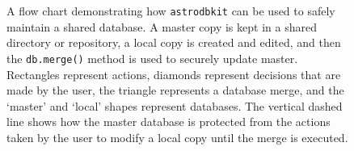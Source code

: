 \documentclass[iop,revtex4,natbib209]{emulateapj}
\begin{document}
\begin{figure}
\begin{center}
\caption{\label{fig:flow}A flow chart demonstrating how \texttt{astrodbkit} can be used to safely maintain a shared database. A master copy is kept in a shared directory or repository, a local copy is created and edited, and then the \texttt{db.merge()} method is used to securely update master. Rectangles represent actions, diamonds represent decisions that are made by the user, the triangle represents a database merge, and the `master' and `local' shapes represent databases. The vertical dashed line shows how the master database is protected from the actions taken by the user to modify a local copy until the merge is executed.}
\end{center}
\end{figure}




\end{document}
